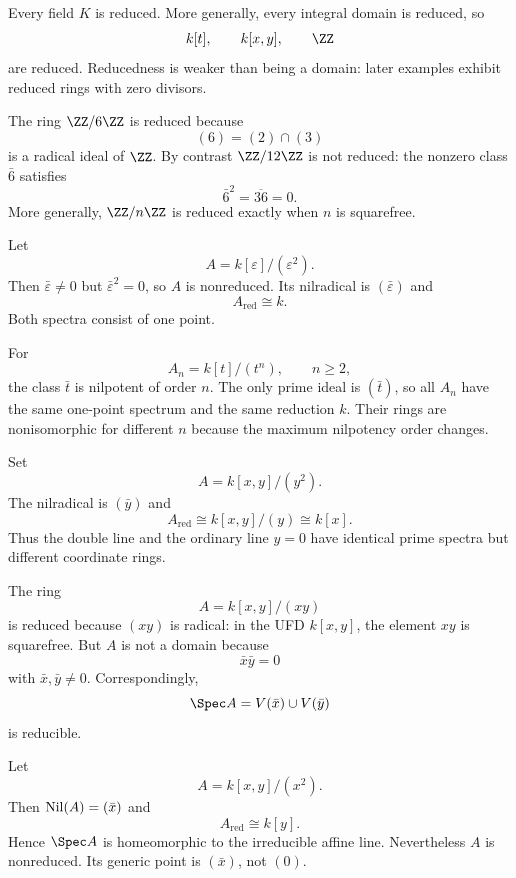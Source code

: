 \begin{example}
Every field $K$ is reduced.  More generally, every integral domain is reduced, so
\[
k[t],\qquad k[x,y],\qquad \ZZ
\]
are reduced.  Reducedness is weaker than being a domain: later examples exhibit reduced
rings with zero divisors.
\end{example}

\begin{example}
The ring $\ZZ/6\ZZ$ is reduced because
\[
(6)=(2)\cap(3)
\]
is a radical ideal of $\ZZ$.  By contrast $\ZZ/12\ZZ$ is not reduced: the nonzero class
$\bar 6$ satisfies
\[
\bar6^2=\overline{36}=0.
\]
More generally, $\ZZ/n\ZZ$ is reduced exactly when $n$ is squarefree.
\end{example}

\begin{example}
Let
\[
A=k[\varepsilon]/(\varepsilon^2).
\]
Then $\bar\varepsilon\neq0$ but $\bar\varepsilon^2=0$, so $A$ is nonreduced.  Its
nilradical is $(\bar\varepsilon)$ and
\[
A_{\mathrm{red}}\cong k.
\]
Both spectra consist of one point.
\end{example}

\begin{example}
For
\[
A_n=k[t]/(t^n),\qquad n\ge2,
\]
the class $\bar t$ is nilpotent of order $n$.  The only prime ideal is $(\bar t)$, so all
$A_n$ have the same one-point spectrum and the same reduction $k$.  Their rings are
nonisomorphic for different $n$ because the maximum nilpotency order changes.
\end{example}

\begin{example}
Set
\[
A=k[x,y]/(y^2).
\]
The nilradical is $(\bar y)$ and
\[
A_{\mathrm{red}}
\cong
k[x,y]/(y)
\cong
k[x].
\]
Thus the double line and the ordinary line $y=0$ have identical prime spectra but different
coordinate rings.
\end{example}

\begin{example}
The ring
\[
A=k[x,y]/(xy)
\]
is reduced because $(xy)$ is radical: in the UFD $k[x,y]$, the element $xy$ is squarefree.
But $A$ is not a domain because
\[
\bar x\bar y=0
\]
with $\bar x,\bar y\neq0$.  Correspondingly,
\[
\Spec A=V(\bar x)\cup V(\bar y)
\]
is reducible.
\end{example}

\begin{example}
Let
\[
A=k[x,y]/(x^2).
\]
Then $\operatorname{Nil}(A)=(\bar x)$ and
\[
A_{\mathrm{red}}\cong k[y].
\]
Hence $\Spec A$ is homeomorphic to the irreducible affine line.  Nevertheless $A$ is
nonreduced.  Its generic point is $(\bar x)$, not $(0)$.
\end{example}

